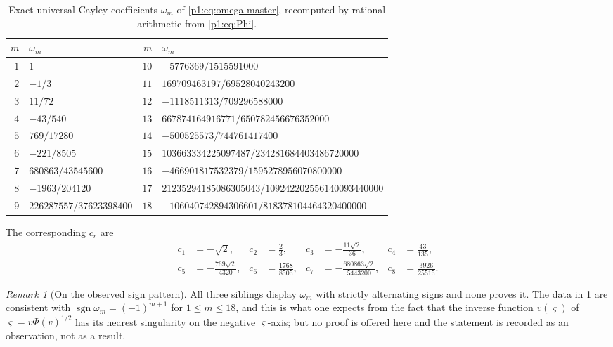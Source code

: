 \documentclass[11pt,a4paper,oneside]{book}
\theoremstyle{plain}
\theoremstyle{definition}
\theoremstyle{remark}
\newtheorem{remark}[theorem]{Remark}
\DeclareMathOperator{\sgn}{sgn}
\begin{document}
\begin{table}[htbp]
\centering
\caption{Exact universal Cayley coefficients $\omega_m$ of
\cref{p1:eq:omega-master}, recomputed by rational arithmetic from
\cref{p1:eq:Phi}.}
\label{p1:tab:omega}
\footnotesize
\setlength{\tabcolsep}{5pt}
\begin{tabular}{r@{\quad}l@{\qquad}r@{\quad}l}
\toprule
$m$ & $\omega_m$ & $m$ & $\omega_m$\\
\midrule
$1$ & $1$ & $10$ & $-5776369/1515591000$\\
$2$ & $-1/3$ & $11$ & $169709463197/69528040243200$\\
$3$ & $11/72$ & $12$ & $-1118511313/709296588000$\\
$4$ & $-43/540$ & $13$ & $667874164916771/650782456676352000$\\
$5$ & $769/17280$ & $14$ & $-500525573/744761417400$\\
$6$ & $-221/8505$ & $15$ & $103663334225097487/234281684403486720000$\\
$7$ & $680863/43545600$ & $16$ & $-466901817532379/1595278956070800000$\\
$8$ & $-1963/204120$ & $17$ & $21235294185086305043/109242202556140093440000$\\
$9$ & $226287557/37623398400$ & $18$ & $-106040742894306601/818378104464320400000$\\
\bottomrule
\end{tabular}
\end{table}

The corresponding $c_r$ are
\begin{equation}
\begin{aligned}
 c_1&=-\sqrt2, & c_2&=\tfrac23, &
 c_3&=-\tfrac{11\sqrt2}{36}, & c_4&=\tfrac{43}{135},\\
 c_5&=-\tfrac{769\sqrt2}{4320}, & c_6&=\tfrac{1768}{8505}, &
 c_7&=-\tfrac{680863\sqrt2}{5443200}, & c_8&=\tfrac{3926}{25515}.
\end{aligned}
\label{p1:eq:c-values}
\end{equation}

\begin{remark}[On the observed sign pattern]
\label{p1:rem:omega-signs}
All three siblings display $\omega_m$ with strictly alternating signs and none proves it.  The
data in \cref{p1:tab:omega} are consistent with $\sgn\omega_m=(-1)^{m+1}$ for $1\le m\le18$,
and this is what one expects from the fact that the inverse function $v(\varsigma)$ of
$\varsigma=v\Phi(v)^{1/2}$ has its nearest singularity on the negative $\varsigma$-axis; but
no proof is offered here and the statement is recorded as an observation, not as a result.
\end{remark}
\end{document}

